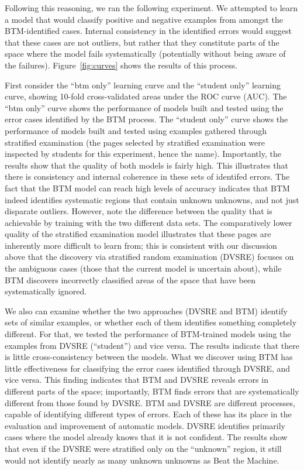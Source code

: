 Following this reasoning, we ran the following experiment.  We attempted to learn a model that would classify positive and negative examples from amongst the BTM-identified cases.  Internal consistency in the identified errors would suggest that these cases are not outliers, but rather that they constitute parts of the space where the model fails systematically (potentially without being aware of the failures).
Figure~\ref{fig:curves} shows the results of this process. 

First consider the ``btm only'' learning curve and the ``student only'' learning curve, showing 10-fold cross-validated areas under the ROC curve (AUC).
The ``btm only'' curve shows the performance of models built and tested
using the error cases identified by the BTM process.  The ``student
only'' curve shows the performance of models built and tested using
examples gathered through stratified examination (the pages selected
by stratified examination were inspected by students for this
experiment, hence the name).  Importantly,
the results show that the quality of both models is fairly high.  This
illustrates that there is consistency and internal coherence in these
sets of identifed errors.  The fact that the BTM model can reach high levels of
accuracy indicates that BTM indeed identifies systematic regions that
contain unknown unknowns, and not just disparate outliers.  However,
note the difference between the quality that is achievable by training
with the two different data sets.  The comparatively lower quality of
the stratified examination model illustrates that these pages are inherently
more difficult to learn from; this is consistent with our discussion
above that the discovery via stratified random examination (DVSRE)
focuses on the ambiguous cases (those that the current model is
uncertain about), while BTM discovers incorrectly classified areas of
the space that have been systematically ignored.

We also can examine whether the two approaches (DVSRE and BTM) identify sets of similar examples, or whether each of them identifies something completely different. For that, we tested the performance of BTM-trained models using the examples from DVSRE (``student'') and vice versa. The results indicate that there is little cross-consistency between the models. What we discover using BTM has little effectiveness for classifying the error cases identified through DVSRE, and vice versa. This finding indicates that BTM and DVSRE reveals errors in different parts of the space; importantly, BTM finds errors that are systematically different from those found by DVSRE.
BTM and DVSRE are different processes, capable of identifying different types of errors. Each of these has its place in the evaluation and improvement of automatic models. DVSRE identifies primarily cases where the model already knows that it is not confident. 
The results show that even if the DVSRE were stratified only on the ``unknown'' region, it still would not identify nearly as many unknown unknowns as Beat the Machine.



